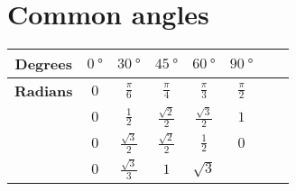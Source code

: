 \section*{Common angles}


\begin{table}[!ht]
\setlength{\tabcolsep}{1em} %
\centering
  \tabulinesep=1.5mm
  \begin{tabu}{|c|c|c|c|c|c|c|c|}
    \hline
    \textbf{Degrees}
      & $\SI{0}{\degree}$
      & $\SI{30}{\degree}$
      & $\SI{45}{\degree}$
      & $\SI{60}{\degree}$
      & $\SI{90}{\degree}$\\
    \hline
    \textbf{Radians}
      & $\displaystyle 0$
      & $\displaystyle \frac{\pi}{6}$
      & $\displaystyle \frac{\pi}{4}$
      & $\displaystyle \frac{\pi}{3}$
      & $\displaystyle \frac{\pi}{2}$\\
    \hline
    \textbf{\bm{$\sin \theta$}}
      & $\displaystyle 0$
      & $\displaystyle \frac{1}{2}$
      & $\displaystyle \frac{\sqrt 2}{2}$
      & $\displaystyle \frac{\sqrt 3}{2}$
      & $\displaystyle 1$\\
    \hline
    \textbf{\bm{$\cos \theta$}}
      & $\displaystyle 0$
      & $\displaystyle \frac{\sqrt 3}{2}$
      & $\displaystyle \frac{\sqrt 2}{2}$
      & $\displaystyle \frac{1}{2}$
      & $\displaystyle 0$\\
    \hline
    \textbf{\bm{$\tan \theta$}}
      & $\displaystyle 0$
      & $\displaystyle \frac{\sqrt 3}{3}$
      & $\displaystyle 1$
      & $\displaystyle \sqrt 3$
      &\\
    \hline
  \end{tabu}
\end{table}